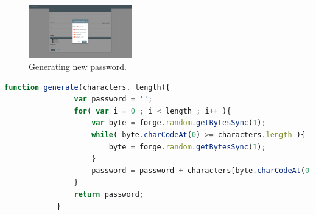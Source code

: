 		\begin{figure}[p]
			\centering
			\includegraphics[width=0.4\textwidth,clip,trim=750 250 750 250]{figures/implementation/screenshots/add-password.png}
			\caption{Generating new password.}
			\label{fig:impl:password:generate}
		\end{figure}

		\begin{lstlisting}[language=Javascript,gobble=12,caption={Generating the password, using the value cut-off method},label={lst:impl:password:generate}]
            function generate(characters, length){
                var password = '';
                for( var i = 0 ; i < length ; i++ ){
                    var byte = forge.random.getBytesSync(1);
                    while( byte.charCodeAt(0) >= characters.length ){
                        byte = forge.random.getBytesSync(1);					
                    }
                    password = password + characters[byte.charCodeAt(0)];
                } 
                return password;
            }	
		\end{lstlisting}